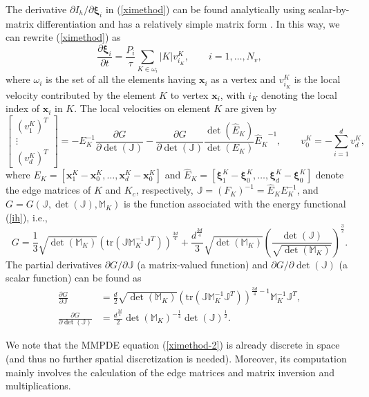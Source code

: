 \documentclass{siamart0516}
\renewcommand{\eqref}[1]{(\ref{#1})}
\def \M{\mathbb{M}}
\def \J{\mathbb{J}}
\newcommand{\bx}{\mathbf{x}}
\newcommand{\bxi}{\bs{\xi}}
\newcommand{\bs}[0]{\boldsymbol}
\theoremstyle{plain}%
\theoremstyle{definition}
\theoremstyle{remark}
\begin{document}
The derivative $\partial I_h/\partial \bxi_i$ in (\ref{ximethod})
can be found analytically using scalar-by-matrix differentiation and has a
relatively simple matrix form \cite{HK2014}. In this way, we can rewrite \eqref{ximethod} as
\begin{equation}
\frac{\partial \bxi_i}{\partial t} = \frac{P_i}{\tau} \sum_{K \in \omega_i} |K| v_{i_K}^K, \qquad i = 1,\ldots, N_v,
\label{ximethod-2}
\end{equation}
where $\omega_i$ is the set of all the elements having $\bx_i$ as a vertex and $v_{i_K}^K$ is the local velocity
contributed by the element $K$ to vertex $\bx_i$, with $i_K$ denoting the local index of $\bx_i$ in $K$.
The local velocities on element $K$ are given by
\begin{equation}
\begin{bmatrix}
(v_1^K)^T \\
\vdots \\
(v_d^K)^T
\end{bmatrix} = -E_K^{-1} \frac{\partial G}{\partial \det(\J)}
- \frac{\partial G}{\partial \det(\J)} \frac{\det(\hat{E}_K)}{\det(E_K)} {\hat{E}_K}^{-1},
\qquad v_0^{K} = - \sum_{ i = 1}^d v_d^K,
\label{velocity}
\end{equation}
where $E_K = [\bx_1^K-\bx_0^K, \ldots, \bx_d^K-\bx_0^K]$ and $\hat{E}_K = [\bxi_1^K-\bxi_0^K, \ldots, \bxi_d^K-\bxi_0^K]$
denote the edge matrices of $K$ and $K_c$, respectively,  $\J = (F_K)^{-1} = \hat{E}_K E_K^{-1}$, and
$G = G(\J, \det(\J), \M_K)$ is the function associated with the energy functional \eqref{ih}, i.e.,
\[
 G = \frac{1}{3} \sqrt{\det(\M_K)} (\text{tr}(\J\M_K^{-1}\J^T))^{\frac{3 d}{4}}
+ \frac{d^{\frac{3 d}{4}}}{3} \sqrt{\det(\M_K)}\left (\frac{\det(\J)}{\sqrt{\det(\M_K)}}\right )^{\frac{3}{2}}.
\]
The partial derivatives  $ \partial G/\partial \J$ (a matrix-valued function)
and $\partial G/\partial \det(\J)$ (a scalar function) can be found as
\begin{align*}
 \frac{\partial G}{\partial \J} &= \frac{d}{2} \sqrt{\det(\M_K)}(\text{tr}(\J\M_K^{-1}\J^T))^{\frac{3d}{4} - 1}\M_K^{-1}\J^T, \\[5pt]
 \frac{\partial G}{\partial \det(\J)} &= \frac{d^{\frac{3d}{4}}}{2} \det(\M_K)^{-\frac{1}{4}} \det(\J)^{\frac{1}{2}} .
\end{align*}

We note that the MMPDE equation \eqref{ximethod-2} is already discrete in space (and thus no further spatial
discretization is needed). Moreover, its computation mainly involves the calculation of the edge matrices
and matrix inversion and multiplications.
\end{document}
